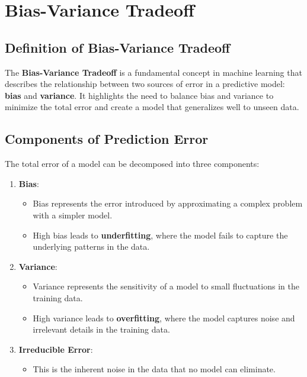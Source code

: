 \section{Bias-Variance Tradeoff}

\subsection*{Definition of Bias-Variance Tradeoff}

The \textbf{Bias-Variance Tradeoff} is a fundamental concept in machine learning that describes the relationship between two sources of error in a predictive model: \textbf{bias} and \textbf{variance}. It highlights the need to balance bias and variance to minimize the total error and create a model that generalizes well to unseen data.

\subsection*{Components of Prediction Error}
The total error of a model can be decomposed into three components:

\begin{enumerate}
    \item \textbf{Bias}:
    \begin{itemize}
        \item Bias represents the error introduced by approximating a complex problem with a simpler model.
        \item High bias leads to \textbf{underfitting}, where the model fails to capture the underlying patterns in the data.
    \end{itemize}

    \item \textbf{Variance}:
    \begin{itemize}
        \item Variance represents the sensitivity of a model to small fluctuations in the training data.
        \item High variance leads to \textbf{overfitting}, where the model captures noise and irrelevant details in the training data.
    \end{itemize}

    \item \textbf{Irreducible Error}:
    \begin{itemize}
        \item This is the inherent noise in the data that no model can eliminate.
    \end{itemize}
\end{enumerate}

